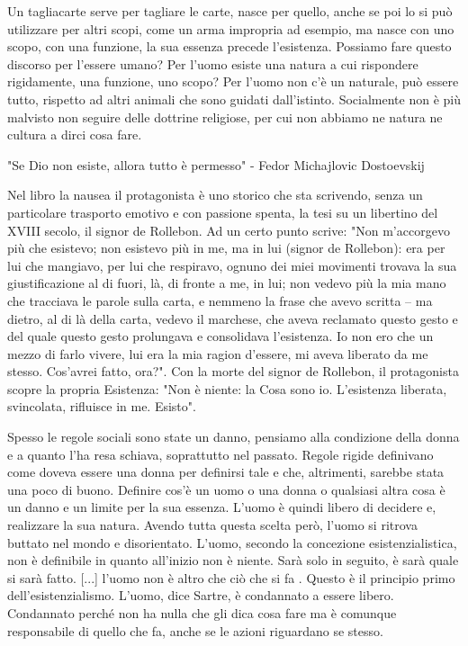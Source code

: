 \documentclass[12pt]{book} %
\begin{document}
\bigskip

Un tagliacarte serve per tagliare le carte, nasce per quello, anche se poi lo si può utilizzare per altri scopi, come un
arma impropria ad esempio, ma nasce con uno scopo, con una funzione, la sua essenza precede l'esistenza. Possiamo fare
questo discorso per l'essere umano? Per l'uomo esiste una natura a cui rispondere rigidamente, una funzione, uno scopo?
Per l'uomo non c'è un {\textquotedbl}naturale{\textquotedbl}, può essere tutto, rispetto ad altri animali che sono
guidati dall'istinto. Socialmente non è più malvisto non seguire delle dottrine religiose, per cui non abbiamo ne
natura ne cultura a dirci cosa fare. 


\bigskip

"Se Dio non esiste, allora tutto è permesso" - Fedor Michajlovic Dostoevskij


\bigskip

Nel libro la nausea il protagonista è uno storico che sta scrivendo,
senza un particolare trasporto emotivo e con passione spenta, la tesi su un libertino del XVIII secolo, il signor de
Rollebon. Ad un certo punto scrive: "Non m'accorgevo più che esistevo; non
esistevo più in me, ma in lui (signor de Rollebon): era per lui che mangiavo, per lui che respiravo, ognuno dei miei
movimenti trovava la sua giustificazione al di fuori, là, di fronte a me, in lui; non vedevo più la mia mano che
tracciava le parole sulla carta, e nemmeno la frase che avevo scritta – ma dietro, al di là della carta, vedevo il
marchese, che aveva reclamato questo gesto e del quale questo gesto prolungava e consolidava
l'esistenza. Io non ero che un mezzo di farlo vivere, lui era la mia ragion
d'essere, mi aveva liberato da me stesso. Cos'avrei fatto,
ora?". Con la morte del signor de Rollebon, il protagonista scopre la propria Esistenza:
"Non è niente: la Cosa sono io. L'esistenza liberata, svincolata, rifluisce
in me. Esisto". 


\bigskip

Spesso le regole sociali sono state un danno, pensiamo alla condizione della donna e a quanto l'ha resa schiava,
soprattutto nel passato. Regole rigide definivano come doveva essere una donna per definirsi tale e che, altrimenti,
sarebbe stata una poco di buono. Definire cos'è un uomo o una donna o qualsiasi altra cosa è un danno e un limite per
la sua essenza. L'uomo è quindi libero di decidere e, realizzare la sua natura. Avendo tutta questa scelta però, l'uomo
si ritrova buttato nel mondo e disorientato.
\newline
\newline
L'uomo, secondo la concezione esistenzialistica, non è definibile in quanto all'inizio non è niente. Sarà solo in
seguito, è sarà quale si sarà fatto. [...] l'uomo non è altro che ciò che si fa . Questo è il principio primo
dell'esistenzialismo.
\newline
\newline
L'uomo, dice Sartre, è condannato a essere libero. Condannato perché non ha nulla che gli dica cosa fare ma è comunque
responsabile di quello che fa, anche se le azioni riguardano se stesso.
\end{document}
